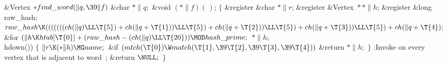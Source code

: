 \Y\B\1\1\&{Vertex} ${}{*}\\{find\_word}(\|q,\39\|f){}$\6
\&{char} ${}{*}\|q;{}$\6
\&{void} ${}({*}\|f)(\,){}$;\2\2\6
${}\{{}$\5
\1\&{register} \&{char} ${}{*}\|r{}$;\6
\&{register} \&{Vertex} ${}{*}{*}\|h{}$;\6
\&{register} \&{long} \\{raw\_hash};\7
${}\\{raw\_hash}\K(((((((\\{ch}(\|q)\LL\T{5})+\\{ch}(\|q+\T{1}))\LL\T{5})+%
\\{ch}(\|q+\T{2}))\LL\T{5})+\\{ch}(\|q+\T{3}))\LL\T{5})+\\{ch}(\|q+\T{4});{}$\6
\&{for} ${}(\|h\K\\{htab}[\T{0}]+(\\{raw\_hash}-(\\{ch}(\|q)\LL\T{20}))\MOD%
\\{hash\_prime};{}$ ${}{*}\|h;{}$ \\{hdown}())\5
${}\{{}$\1\6
${}\|r\K({*}\|h)\MG\\{name};{}$\6
\&{if} ${}(\\{mtch}(\T{0})\W\\{match}(\T{1},\39\T{2},\39\T{3},\39\T{4})){}$\1\5
\&{return} ${}{*}\|h;{}$\2\6
\4${}\}{}$\2\6
:Invoke  on every vertex that is adjacent to word~\X;\6
\&{return} ${}\NULL;{}$\6
\4${}\}{}$\2\par
\fi

